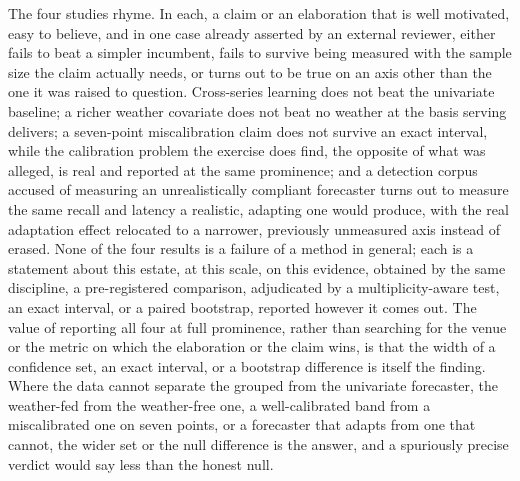 The four studies rhyme. In each, a claim or an elaboration that is well motivated, easy to
believe, and in one case already asserted by an external reviewer, either fails to beat a
simpler incumbent, fails to survive being measured with the sample size the claim actually
needs, or turns out to be true on an axis other than the one it was raised to question.
Cross-series learning does not beat the univariate baseline; a richer weather covariate does not
beat no weather at the basis serving delivers; a seven-point miscalibration claim does not survive
an exact interval, while the calibration problem the exercise does find, the opposite of what was
alleged, is real and reported at the same prominence; and a detection corpus accused of measuring
an unrealistically compliant forecaster turns out to measure the same recall and latency a
realistic, adapting one would produce, with the real adaptation effect relocated to a narrower,
previously unmeasured axis instead of erased. None of the four results is a failure of a method
in general; each is a statement about this estate, at this scale, on this evidence, obtained by
the same discipline, a pre-registered comparison, adjudicated by a multiplicity-aware test, an
exact interval, or a paired bootstrap, reported however it comes out. The value of reporting all
four at full prominence, rather than searching for the venue or the metric on which the
elaboration or the claim wins, is that the width of a confidence set, an exact interval, or a
bootstrap difference is itself the finding. Where the data cannot separate the grouped from the
univariate forecaster, the weather-fed from the weather-free one, a well-calibrated band from a
miscalibrated one on seven points, or a forecaster that adapts from one that cannot, the wider set
or the null difference is the answer, and a spuriously precise verdict would say less than the
honest null.
